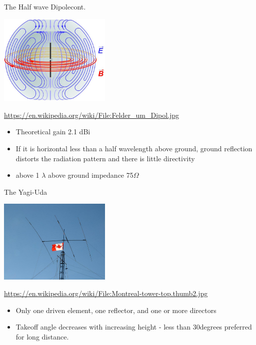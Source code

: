 \documentclass{beamer}
\begin{document}
\begin{frame}{The Half wave Dipole}{cont.}
\begin{centering}
\includegraphics[width=0.4\textwidth]{images/dipolefield.jpg}

\small{\url{https://en.wikipedia.org/wiki/File:Felder_um_Dipol.jpg}}
\end{centering}
\begin{itemize}
\item Theoretical gain 2.1 dBi
\item If it is horizontal less than a half wavelength above ground, ground reflection distorts the radiation pattern and there is little directivity
\item above 1 $\lambda$ above ground impedance 75$\Omega$
\end{itemize}
\end{frame}

\begin{frame}{The Yagi-Uda}{}
\begin{centering}
\includegraphics[width=0.4\textwidth]{images/yagi.jpg}

\small{\url{https://en.wikipedia.org/wiki/File:Montreal-tower-top.thumb2.jpg}}
\end{centering}
\begin{itemize}
\item Only one driven element, one reflector, and one or more directors
\item Takeoff angle decreases with increasing height - less than 30degrees preferred for long distance.
\end{itemize}
\end{frame}
\end{document}
